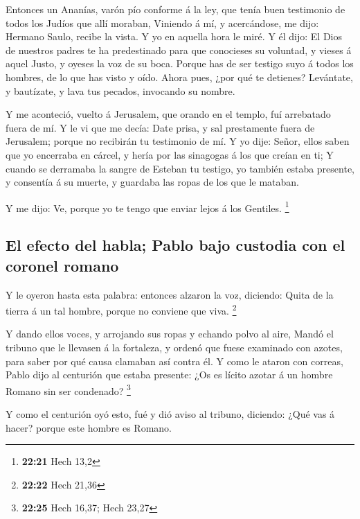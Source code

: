  Entonces un Ananías, varón pío conforme á la ley, que
tenía buen testimonio de todos los Judíos que allí moraban,
 Viniendo á mí, y acercándose, me dijo: Hermano Saulo,
recibe la vista. Y yo en aquella hora le miré.  Y él dijo:
El Dios de nuestros padres te ha predestinado para que conocieses su
voluntad, y vieses á aquel Justo, y oyeses la voz de su boca.
 Porque has de ser testigo suyo á todos los hombres, de lo
que has visto y oído.  Ahora pues, ¿por qué te detienes?
Levántate, y bautízate, y lava tus pecados, invocando su nombre.

 Y me aconteció, vuelto á Jerusalem, que orando en el
templo, fuí arrebatado fuera de mí.  Y le vi que me decía:
Date prisa, y sal prestamente fuera de Jerusalem; porque no recibirán tu
testimonio de mí.  Y yo dije: Señor, ellos saben que yo
encerraba en cárcel, y hería por las sinagogas á los que creían en ti;
 Y cuando se derramaba la sangre de Esteban tu testigo, yo
también estaba presente, y consentía á su muerte, y guardaba las ropas
de los que le mataban.

 Y me dijo: Ve, porque yo te tengo que enviar lejos á los
Gentiles. \footnote{\textbf{22:21} Hech 13,2}

\hypertarget{el-efecto-del-habla-pablo-bajo-custodia-con-el-coronel-romano}{%
\subsection{El efecto del habla; Pablo bajo custodia con el coronel
romano}\label{el-efecto-del-habla-pablo-bajo-custodia-con-el-coronel-romano}}

 Y le oyeron hasta esta palabra: entonces alzaron la voz,
diciendo: Quita de la tierra á un tal hombre, porque no conviene que
viva. \footnote{\textbf{22:22} Hech 21,36}

 Y dando ellos voces, y arrojando sus ropas y echando polvo
al aire,  Mandó el tribuno que le llevasen á la fortaleza,
y ordenó que fuese examinado con azotes, para saber por qué causa
clamaban así contra él.  Y como le ataron con correas,
Pablo dijo al centurión que estaba presente: ¿Os es lícito azotar á un
hombre Romano sin ser condenado? \footnote{\textbf{22:25} Hech 16,37;
  Hech 23,27}

 Y como el centurión oyó esto, fué y dió aviso al tribuno,
diciendo: ¿Qué vas á hacer? porque este hombre es Romano.

